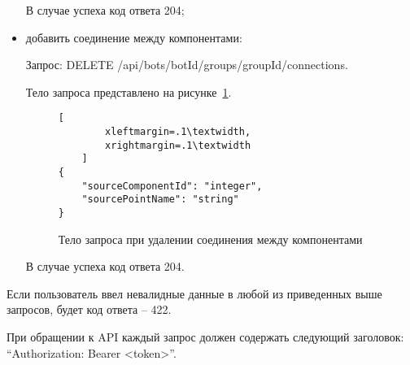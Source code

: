 \begin{itemize}
	      В случае успеха код ответа 204;

	\item добавить соединение между компонентами:

	      Запрос: DELETE /api/bots/{botId}/groups/{groupId}/connections.

	      Тело запроса представлено на рисунке~\ref{f:delete-connection}.

	      \begin{figure}[!ht]
		      \centering
		      \vspace{\toppaddingoffigure}
		      \begin{lstlisting}[
        xleftmargin=.1\textwidth,
        xrightmargin=.1\textwidth
    ]
{
    "sourceComponentId": "integer",
    "sourcePointName": "string"
}
    \end{lstlisting}
		      \caption{Тело запроса при удалении соединения между компонентами}
		      \label{f:delete-connection}
	      \end{figure}

	      В случае успеха код ответа 204.

\end{itemize}


Если пользователь ввел невалидные данные в любой из приведенных
выше запросов, будет код ответа – 422.

При обращении к API каждый запрос должен содержать следующий
заголовок: “Authorization: Bearer <token>”.

